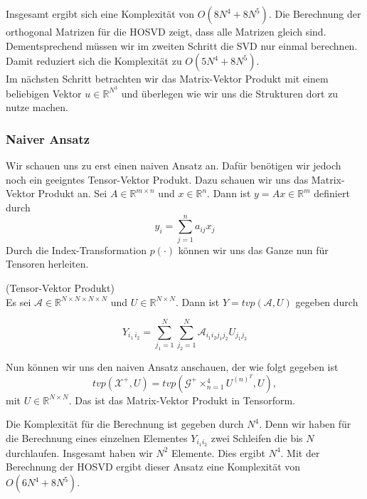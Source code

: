 Insgesamt ergibt sich eine Komplexität von $O(8N^4  + 8N^5)$. 
Die Berechnung der orthogonal Matrizen für die HOSVD zeigt, dass alle Matrizen gleich sind. Dementsprechend müssen wir im zweiten Schritt die SVD nur einmal berechnen. Damit reduziert sich die Komplexität zu $O(5N^4  + 8N^5)$. \\

Im nächsten Schritt betrachten wir das Matrix-Vektor Produkt mit einem beliebigen Vektor $u \in \mathbb{R}^{N^3}$ und überlegen wie wir uns die Strukturen dort zu nutze machen.

\subsubsection{Naiver Ansatz}
Wir schauen uns zu erst einen naiven Ansatz an. Dafür benötigen wir jedoch noch ein geeigntes Tensor-Vektor Produkt. 
Dazu schauen wir uns das Matrix-Vektor Produkt an. Sei $A \in \mathbb{R}^{m \times n}$ und $x \in \mathbb{R}^{n}$. Dann ist $y=Ax \in \mathbb{R}^{m}$ definiert durch
\begin{equation*}
y_i = \sum\limits_{j=1}^{n} a_{ij} x_j
\end{equation*}
Durch die Index-Transformation $p(\cdot)$ können wir uns das Ganze nun für Tensoren herleiten.

\begin{Definition} (Tensor-Vektor Produkt) \\
Es sei $\mathcal{A} \in \mathbb{R}^{N \times N \times N \times N}$ und $U \in \mathbb{R}^{N \times N}$.
Dann ist $Y=tvp(\mathcal{A},U)$ gegeben durch

\begin{equation*}
Y_{i_1 \, i_2} = \sum\limits_{j_1=1}^{N} \sum\limits_{j_2=1}^{N} \mathcal{A}_{i_1 i_2 j_1 j_2} U_{j_1 j_2}
\end{equation*}

\end{Definition}

Nun können wir uns den naiven Ansatz anschauen, der wie folgt gegeben ist
\begin{equation} \label{eq:pinv}
tvp(\mathscr{X}^{+},U) = tvp(\mathscr{G}^{+} \times_{n=1}^{4} U^{ (n) ^{T} },U) ,
\end{equation} 
mit $U \in \mathbb{R}^{N \times N}$. Das ist das Matrix-Vektor Produkt in Tensorform. 

Die Komplexität für die Berechnung ist gegeben durch $N^4$. Denn wir haben für die Berechnung eines einzelnen Elementes $Y_{i_1 i_2}$ zwei Schleifen die bis $N$ durchlaufen. Insgesamt haben wir $N^2$ Elemente. Dies ergibt $N^4$. 
Mit der Berechnung der HOSVD ergibt dieser Ansatz eine Komplexität von $O(6N^4 + 8N^5)$. \\

